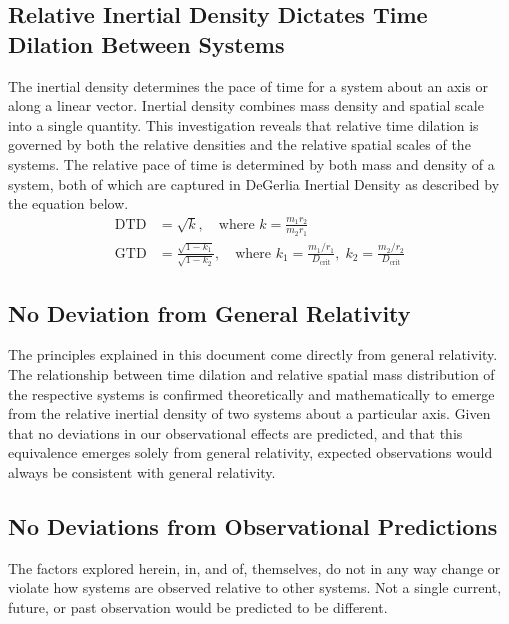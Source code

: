 \documentclass[twoside,twocolumn,9pt,fleqn]{article}
\begin{document}
\subsection{Relative Inertial Density Dictates Time Dilation Between Systems}
The inertial density determines the pace of time for a system about an axis or along a linear vector. Inertial density combines mass density and spatial scale into a single quantity. This investigation reveals that relative time dilation is governed by both the relative densities and the relative spatial scales of the systems. The relative pace of time is determined by both mass and density of a system, both of which are captured in DeGerlia Inertial Density as described by the equation below.
\begin{align}
\mathrm{DTD} &= \sqrt{k}, \quad \text{where } k = \frac{m_1 r_2}{m_2 r_1} \\
\mathrm{GTD} &= \frac{\sqrt{1-k_1}}{\sqrt{1-k_2}}, \quad \text{where } k_1 = \frac{m_1/r_1}{D_{\mathrm{crit}}}, \; k_2 = \frac{m_2/r_2}{D_{\mathrm{crit}}}
\end{align}

\subsection{No Deviation from General Relativity}
The principles explained in this document come directly from general relativity. The relationship between time dilation and relative spatial mass distribution of the respective systems is confirmed theoretically and mathematically to emerge from the relative inertial density of two systems about a particular axis.
Given that no deviations in our observational effects are predicted, and that this equivalence emerges solely from general relativity, expected observations would always be consistent with general relativity.

\subsection{No Deviations from Observational Predictions}
The factors explored herein, in, and of, themselves, do not in any way change or violate how systems are observed relative to other systems. Not a single current, future, or past observation would be predicted to be different.
\end{document}
